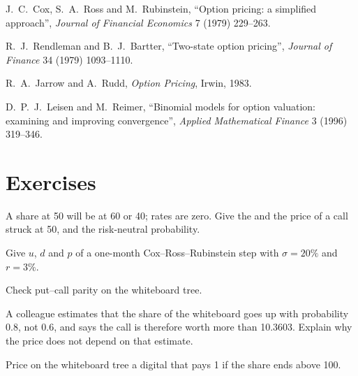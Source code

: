 \begin{omsources}
\item J.~C.~Cox, S.~A.~Ross and M.~Rubinstein, ``Option pricing: a simplified
approach'', \emph{Journal of Financial Economics} 7 (1979) 229--263.
\item R.~J.~Rendleman and B.~J.~Bartter, ``Two-state option pricing'',
\emph{Journal of Finance} 34 (1979) 1093--1110.
\item R.~A.~Jarrow and A.~Rudd, \emph{Option Pricing}, Irwin, 1983.
\item D.~P.~J.~Leisen and M.~Reimer, ``Binomial models for option valuation:
examining and improving convergence'', \emph{Applied Mathematical Finance} 3
(1996) 319--346.
\end{omsources}

\section{Exercises}

\begin{exercise}[$\star$]\label{exo:dv:the-binomial-model:1}
A share at 50 will be at 60 or 40; rates are zero. Give the 
and the price of a call struck at 50, and the risk-neutral probability.
\end{exercise}

\begin{exercise}[$\star$]\label{exo:dv:the-binomial-model:2}
Give $u$, $d$ and $p$ of a one-month Cox--Ross--Rubinstein step with $\sigma=20\%$
and $r=3\%$.
\end{exercise}

\begin{exercise}[$\star$]\label{exo:dv:the-binomial-model:3}
Check put--call parity on the whiteboard tree.
\end{exercise}

\begin{exercise}[$\star\star$]\label{exo:dv:the-binomial-model:4}
A colleague estimates that the share of the whiteboard goes up with probability
0.8, not 0.6, and says the call is therefore worth more than 10.3603. Explain why
the price does not depend on that estimate.
\end{exercise}

\begin{exercise}[$\star\star$]\label{exo:dv:the-binomial-model:5}
Price on the whiteboard tree a digital that pays 1 if the share ends above 100.
\end{exercise}

